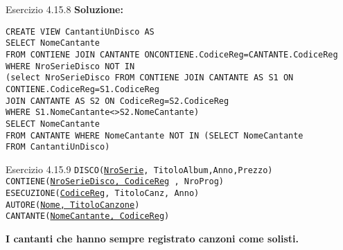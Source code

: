 \begin{frame}{Esercizio 4.15.8}
    \textbf{Soluzione:}
    \vspace{1em}
    
    \texttt{CREATE VIEW CantantiUnDisco AS
\\SELECT NomeCantante
\\FROM CONTIENE JOIN CANTANTE ONCONTIENE.CodiceReg=CANTANTE.CodiceReg\\WHERE NroSerieDisco NOT IN
\\(select NroSerieDisco
FROM CONTIENE JOIN CANTANTE AS S1 ON
CONTIENE.CodiceReg=S1.CodiceReg\\JOIN CANTANTE AS S2 ON CodiceReg=S2.CodiceReg\\WHERE S1.NomeCantante<>S2.NomeCantante)\\
\vspace{1em}
SELECT NomeCantante\\FROM CANTANTE
WHERE NomeCantante NOT IN (SELECT NomeCantante\\FROM CantantiUnDisco)}
    \end{frame}
\begin{frame}{Esercizio 4.15.9}
    \texttt{DISCO(\underline{NroSerie}, TitoloAlbum,Anno,Prezzo)\\
    CONTIENE(\underline{NroSerieDisco, CodiceReg} , NroProg)\\
    ESECUZIONE(\underline{CodiceReg}, TitoloCanz, Anno)\\
    AUTORE(\underline{Nome, TitoloCanzone})\\
    CANTANTE(\underline{NomeCantante, CodiceReg})}
    \vspace{1em}
    
    \textbf{I cantanti che hanno sempre registrato canzoni come solisti.}
\end{frame}

